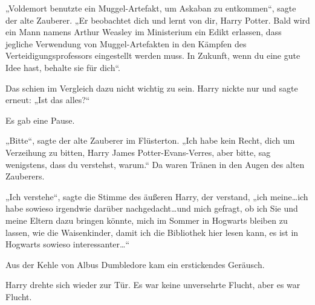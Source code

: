 „Voldemort benutzte ein Muggel-Artefakt, um Askaban zu entkommen“, sagte der alte Zauberer.
„Er beobachtet dich und lernt von dir, Harry Potter. Bald wird ein Mann namens Arthur Weasley im Ministerium ein Edikt erlassen, dass jegliche Verwendung von Muggel-Artefakten in den Kämpfen des Verteidigungsprofessors eingestellt werden muss. In Zukunft, wenn du eine gute Idee hast, behalte sie für dich“.

Das schien im Vergleich dazu nicht wichtig zu sein. Harry nickte nur und sagte erneut:
„Ist das alles?“

Es gab eine Pause.

„Bitte“, sagte der alte Zauberer im Flüsterton.
„Ich habe kein Recht, dich um Verzeihung zu bitten, Harry James Potter-Evans-Verres, aber bitte, sag wenigstens, dass du verstehst, warum.“ Da waren Tränen in den Augen des alten Zauberers.

„Ich verstehe“, sagte die Stimme des äußeren Harry, der verstand, „ich meine…ich habe sowieso irgendwie darüber nachgedacht…und mich gefragt, ob ich Sie und meine Eltern dazu bringen könnte, mich im Sommer in Hogwarts bleiben zu lassen, wie die Waisenkinder, damit ich die Bibliothek hier lesen kann, es ist in Hogwarts sowieso interessanter…“

Aus der Kehle von Albus Dumbledore kam ein erstickendes Geräusch.

Harry drehte sich wieder zur Tür. Es war keine unversehrte Flucht, aber es war Flucht.

